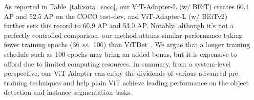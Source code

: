 \documentclass{article} \usepackage{iclr2023_conference,times}
\begin{document}
As reported in Table~\ref{tab:sota_coco},
our ViT-Adapter-L (w/ BEiT) creates 60.4 AP and 52.5 AP on the COCO test-dev, and ViT-Adapter-L (w/ BEiTv2) further sets this record to 60.9 AP and 53.0 AP.
Notably, although it's not a perfectly controlled comparison, our method attains similar performance taking fewer training epochs (36 \emph{vs.}~100) than ViTDet~\citep{li2022exploring}.
We argue that a longer training schedule such as 100 epochs may bring an added bonus, but it is expensive to afford due to limited computing resources.
In summary, from a system-level perspective, our ViT-Adapter can enjoy the dividends of various advanced pre-training techniques and help plain ViT achieve leading performance on the object detection and instance segmentation tasks.
\end{document}
